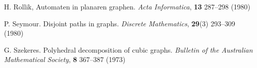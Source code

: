 \documentclass[12pt,letterpaper,oneside]{book}
\begin{document}
\begin{thebibliography}{9}
 H. Rollik, Automaten in planaren graphen.  \emph{Acta Informatica}, \textbf{13} 287--298 (1980)  %


 P. Seymour.  Disjoint paths in graphs.  \emph{Discrete Mathematics}, \textbf{29}(3) 293--309 (1980)  


 G. Szekeres.  Polyhedral decomposition of cubic graphs.  \emph{Bulletin of the Australian Mathematical 
Society}, \textbf{8} 367--387 (1973)  





\end{thebibliography}







 
\end{document}
